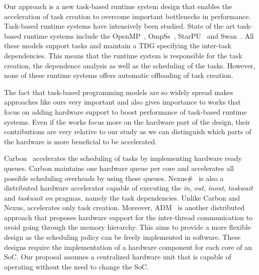 Our approach is a new task-based runtime system design that enables the acceleration of task creation to overcome important bottlenecks in performance.
Task-based runtime systems have intensively been studied.
State of the art task-based runtime systems include the OpenMP~\cite{OpenMP}, OmpSs~\cite{OmpSs_PPL11}, StarPU~\cite{starpu} and Swan~\cite{Vandierendonck:PACT2011}.
All these models support tasks and maintain a TDG specifying the inter-task dependencies.
This means that the runtime system is responsible for the task creation, the dependence analysis as well as the scheduling of the tasks.
However, none of these runtime systems offers automatic offloading of task creation.

The fact that task-based programming models are so widely spread makes approaches like ours very important and also gives importance to works that focus on adding hardware support to boost performance of task-based runtime systems.
Even if the works focus more on the hardware part of the design, their contributions are very relative to our study as we can distinguish which parts of the hardware is more beneficial to be accelerated.

Carbon~\cite{Carbon} accelerates the scheduling of tasks by implementing hardware ready queues.
Carbon maintains one hardware queue per core and accelerates all possible scheduling overheads by using these queues.
Nexus\#~\cite{Nexus} is also a distributed hardware accelerator capable of executing the \textit{in}, \textit{out}, \textit{inout}, \textit{taskwait} and \textit{taskwait on} pragmas, namely the task dependencies.
Unlike Carbon and Nexus, {\proposal} accelerates only task creation.
Moreover, ADM~\cite{Sanchez:2010} is another distributed approach that proposes hardware support for the inter-thread communication to avoid going through the memory hierarchy. 
This aims to provide a more flexible design as the scheduling policy can be freely implemented in software.
These designs require the implementation of a hardware component for each core of an SoC.
Our proposal assumes a centralized hardware unit that is capable of operating without the need to change the SoC.

